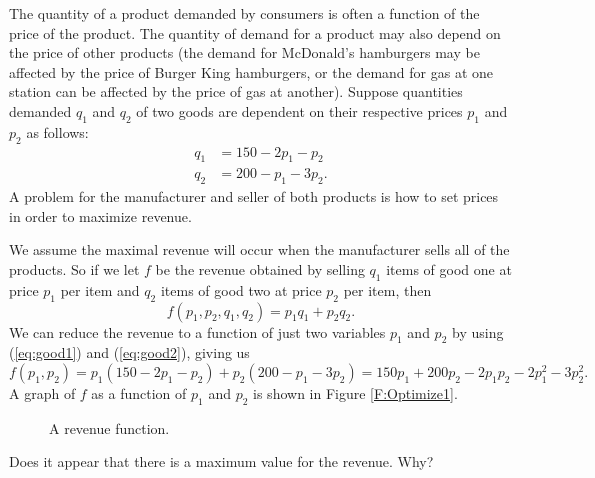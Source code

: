 \begin{pa} \label{PA:10.7} The quantity of a product demanded by consumers is often a function of the price of the product. The quantity of demand for a product may also depend on the price of other products (the demand for McDonald's hamburgers may be affected by the price of Burger King hamburgers, or the demand for gas at one station can be affected by the price of gas at another). Suppose quantities demanded $q_1$ and $q_2$ of two goods are dependent on their respective prices $p_1$ and $p_2$ as follows:
\begin{align}
q_1 &= 150 - 2p_1 - p_2 \label{eq:good1} \\
q_2 &= 200 - p_1 - 3p_2. \label{eq:good2}
\end{align}
A problem for the manufacturer and seller of both products is how to set prices in order to maximize revenue.

We assume the maximal revenue will occur when the manufacturer sells all of the products. So if we let $f$ be the revenue obtained by selling $q_1$ items of good one at price $p_1$ per item and $q_2$ items of good two at price $p_2$ per item, then
\[f(p_1, p_2, q_1, q_2) = p_1q_1 + p_2q_2.\]
We can reduce the revenue to a function of just two variables $p_1$ and $p_2$ by using (\ref{eq:good1}) and (\ref{eq:good2}), giving us
\[f(p_1,p_2) = p_1(150 - 2p_1 - p_2) + p_2(200 - p_1 - 3p_2)= 150p_1 + 200p_2 - 2p_1p_2 -2p_1^2 - 3p_2^2.\]
A graph of $f$ as a function of $p_1$ and $p_2$ is shown in Figure \ref{F:Optimize1}.
\begin{figure}[h]
\begin{center}
\end{center}
\caption{A revenue function.}
\label{F:10.7.Optimize1}
\end{figure}
    \ba
    \item Does it appear that there is a maximum value for the revenue. Why?



\begin{comment}

It looks like the surface in Figure \ref{F:Optimize1} reaches a high point, so it does appear that there is a maximum value for the revenue.



\end{comment}


\end{pa}
